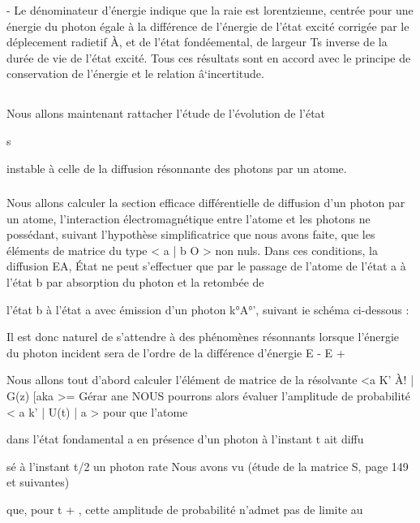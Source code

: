 - Le dénominateur d'énergie indique que la raie est lorentzienne,
centrée pour une énergie du photon égale à la différence de l'énergie de l'état
excité corrigée par le déplecement radietif À, et de l'état fondéemental, de
largeur Ts inverse de la durée de vie de l'état excité. Tous ces résultats sont
en accord avec le principe de conservation de l'énergie et le relation â‘incertitude.

\subsection{}%



Nous allons maintenant rattacher l'étude de l'évolution de l'état

s

instable à celle de la diffusion résonnante des photons par un atome.
\subsubsection{}%

Nous allons calculer la section efficace différentielle de diffusion d'un photon par un atome, l'interaction électromagnétique entre l'atome
et les photons ne possédant, suivant l'hypothèse simplificatrice que nous avons
faite, que les éléments de matrice du type < a | b O > non nuls. Dans
ces conditions, la diffusion EA, État ne peut s'effectuer que par le passage de
l'atome de l'état a à l'état b par absorption du photon  et la retombée de

l'état b à l'état a avec émission d'un photon k°A°', suivant ie schéma ci-dessous :


Il est donc naturel de s'attendre à des phénomènes résonnants
lorsque l'énergie du photon incident sera de l'ordre de la différence d'énergie E  - E +

Nous allons tout d'abord calculer l'élément de matrice de la
résolvante <a K' À! | G(z) [aka >= Gérar ane NOUS pourrons alors évaluer l'amplitude de probabilité < a k'  | U(t) | a > pour que l'atome

dans l'état fondamental a en présence d'un photon  à l'instant t ait diffu

sé à l'instant t/2 un photon rate
Nous avons vu (étude de la matrice S, page 149 et suivantes)

que, pour t + , cette amplitude de probabilité n'admet pas de limite au

